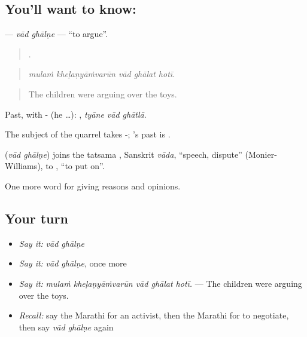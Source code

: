 \subsection*{You'll want to know:  }
\textbf{ } — \emph{vād ghālṇe} — \textquotedblleft{}to argue\textquotedblright{}.

\begin{quote}
    .
\end{quote}

\begin{quote}
\emph{mulaṁ kheḷaṇyāṁvarūn vād ghālat hotī.}
\end{quote}

\begin{quote}
The children were arguing over the toys.
\end{quote}

Past, with - (he …):   , \emph{tyāne vād ghātlā}.

The subject of the quarrel takes -; 's past is .

\begin{cousinweb}
\textbf{ } (\emph{vād ghālṇe}) joins the tatsama , Sanskrit \emph{vāda}, \textquotedblleft{}speech, dispute\textquotedblright{} (Monier-Williams), to , \textquotedblleft{}to put on\textquotedblright{}.
\end{cousinweb}

\begin{grammarlens}[title={What you've built}]
One more word for giving reasons and opinions.
\end{grammarlens}

\subsection*{Your turn}
\begin{itemize}
\raggedright
  \item \emph{Say it:} \emph{vād ghālṇe}
  \item \emph{Say it:} \emph{vād ghālṇe}, once more
  \item \emph{Say it:} \emph{mulaṁ kheḷaṇyāṁvarūn vād ghālat hotī.} — The children were arguing over the toys.
  \item \emph{Recall:} say the Marathi for an activist, then the Marathi for to negotiate, then say \emph{vād ghālṇe} again
\end{itemize}

